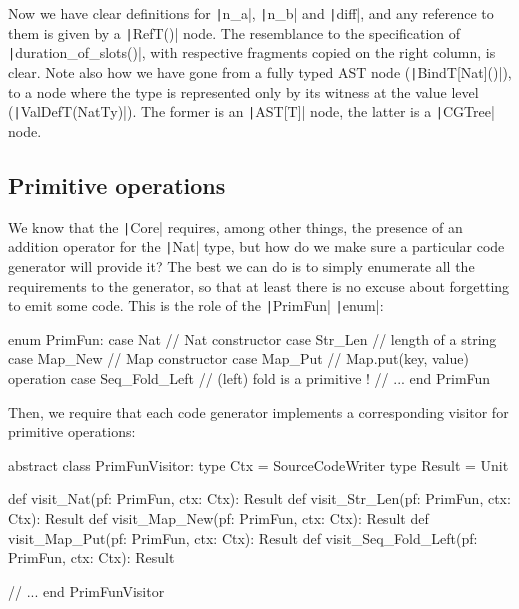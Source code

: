 \documentclass[11pt]{article}
\newcommand{\ScalaI}[1]{\texttt|#1|}
\begin{document}
\noindent Now we have clear definitions for \ScalaI{n_a}, \ScalaI{n_b} and 
\ScalaI{diff}, and any reference to them is given by a \ScalaI{RefT()} node. 
The resemblance to the specification of \ScalaI{duration_of_slots()}, with 
respective fragments copied on the right column, is clear. Note also how we 
have gone from a fully typed AST node (\ScalaI{BindT[Nat]()}), to a node 
where the type is represented only by its witness at the value level 
(\ScalaI{ValDefT(NatTy)}). The former is an \ScalaI{AST[T]} node, the latter 
is a \ScalaI{CGTree} node.

\subsection{Primitive operations}
We know that the \ScalaI{Core} requires, among other things, the presence of 
an addition operator for the \ScalaI{Nat} type, but how do we make sure a 
particular code generator will provide it? The best we can do is to simply 
enumerate all the requirements to the generator, so that at least there is no 
excuse about forgetting to emit some code. This is the role of the 
\ScalaI{PrimFun} \ScalaI{enum}:

\begin{ScalaBlockSimple}
enum PrimFun:
  case Nat           // Nat constructor
  case Str_Len       // length of a string
  case Map_New       // Map constructor
  case Map_Put       // Map.put(key, value) operation
  case Seq_Fold_Left // (left) fold is a primitive !
  // ...
end PrimFun
\end{ScalaBlockSimple}

\noindent Then, we require that each code generator implements a 
corresponding visitor for primitive operations:

\begin{ScalaBlockSimple}
abstract class PrimFunVisitor:
  type Ctx = SourceCodeWriter
  type Result = Unit

  def visit_Nat(pf: PrimFun, ctx: Ctx): Result
  def visit_Str_Len(pf: PrimFun, ctx: Ctx): Result
  def visit_Map_New(pf: PrimFun, ctx: Ctx): Result
  def visit_Map_Put(pf: PrimFun, ctx: Ctx): Result
  def visit_Seq_Fold_Left(pf: PrimFun, ctx: Ctx): Result
  
  // ...
end PrimFunVisitor
\end{ScalaBlockSimple}

\end{document}

